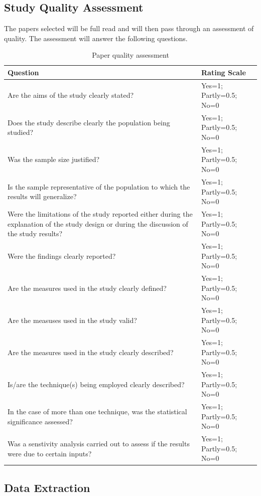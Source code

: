 \documentclass[12pt]{article}
\begin{document}
\subsection{Study Quality Assessment}
The papers selected will be full read and will then pass through an assessment of quality. The assessment will answer the following questions. 
\begin{table}
	\begin{tabular}{ p{6cm} | p{6cm} }
	\hline
	Question & Rating Scale \\ \hline
	Are the aims of the study clearly stated? & Yes=1; Partly=0.5; No=0 \\ \hline
	Does the study describe clearly the population being studied? & Yes=1; Partly=0.5; No=0 \\ \hline
	Was the sample size justified? & Yes=1; Partly=0.5; No=0 \\ \hline
	Is the sample representative of the population to which the results will generalize? & Yes=1; Partly=0.5; No=0 \\ \hline
	Were the limitations of the study reported either during the explanation of the study design or during the discussion of the study results? & Yes=1; Partly=0.5; No=0 \\ \hline
	Were the findings clearly reported? & Yes=1; Partly=0.5; No=0 \\ \hline
	\hline
	Are the measures used in the study clearly defined? & Yes=1; Partly=0.5; No=0 \\ \hline
	Are the measuses used in the study valid? & Yes=1; Partly=0.5; No=0 \\ \hline
	Are the measures used in the study clearly described? & Yes=1; Partly=0.5; No=0 \\ \hline
	\hline
	Is/are the technique(s) being employed clearly described? & Yes=1; Partly=0.5; No=0 \\ \hline
	In the case of more than one technique, was the statistical significance assessed? & Yes=1; Partly=0.5; No=0 \\ \hline
	Was a senstivity analysis carried out to assess if the results were due to certain inputs? & Yes=1; Partly=0.5; No=0 \\ \hline
	\end{tabular}
	\caption[Table caption text]{Paper quality assessment}
	\label{table:name}
\end{table}




\subsection{Data Extraction}
\end{document}
